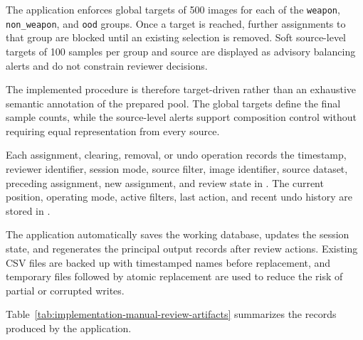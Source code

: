 The application enforces global targets of 500 images for each of the
\texttt{weapon}, \texttt{non\_weapon}, and \texttt{ood} groups. Once a target
is reached, further assignments to that group are blocked until an existing
selection is removed. Soft source-level targets of 100 samples per group and
source are displayed as advisory balancing alerts and do not constrain reviewer
decisions.

The implemented procedure is therefore target-driven rather than an exhaustive
semantic annotation of the prepared pool. The global targets define the final
sample counts, while the source-level alerts support composition control
without requiring equal representation from every source.

Each assignment, clearing, removal, or undo operation records the timestamp,
reviewer identifier, session mode, source filter, image identifier, source
dataset, preceding assignment, new assignment, and review state in
. The current
position, operating mode, active filters, last action, and recent undo history
are stored in
.

The application automatically saves the working database, updates the session
state, and regenerates the principal output records after review actions.
Existing CSV files are backed up with timestamped names before replacement, and
temporary files followed by atomic replacement are used to reduce the risk of
partial or corrupted writes.

Table~\ref{tab:implementation-manual-review-artifacts} summarizes the records
produced by the application.

